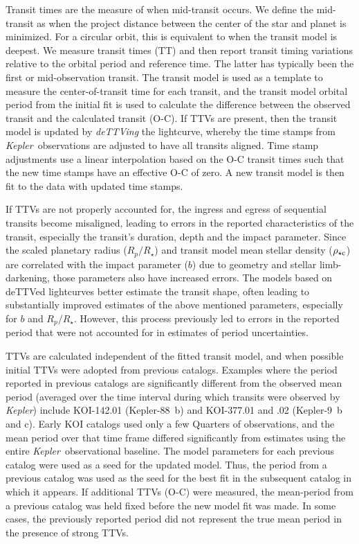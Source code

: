 \documentclass{aastex62}
\newcommand{\ikt}{{\it Kepler}}
\newcommand{\ik}{{\it Kepler~}}
\newcommand{\rhoc}{\ensuremath{\rho_{\star {\rm c}}}}
\begin{document}
{Transit times are the measure of when mid-transit occurs.  We define the mid-transit as when the project distance between the center of the star and planet is minimized.  For a circular orbit, this is equivalent to when the transit model is deepest. We measure transit times (TT) and then report transit timing variations relative to the orbital period and reference time.  The latter has typically been the first or mid-observation transit. The transit model is used as a template to measure the center-of-transit time for each transit, and the transit model orbital period from the initial fit is used to calculate the difference between the observed transit and the calculated transit (O-C).}   If TTVs are present, then the transit model is updated by {\it deTTVing} the lightcurve, whereby the time stamps from \ik observations are adjusted to have all transits aligned.  Time stamp adjustments use a linear interpolation based on the O-C transit times such that the new time stamps have an effective O-C of zero.  A new transit model is then fit to the data with updated time stamps. 

If TTVs are not properly accounted for, the ingress and egress of sequential transits become misaligned, leading to errors in the reported characteristics of the transit, especially the transit's duration, depth and the impact parameter.  Since the scaled planetary radius ($R_p/R_\star$) and transit model mean stellar density (\rhoc) are correlated with the impact parameter ($b$) due to geometry and stellar limb-darkening, those parameters also have increased errors.  The models based on deTTVed lightcurves better estimate the transit shape, {often leading to substantially improved estimates of the above mentioned parameters, especially} for $b$ and $R_p/R_\star$. However, this process {previously led to errors in the reported period that were not accounted for in estimates of period uncertainties.}

TTVs are calculated independent of the fitted transit model, and when possible initial TTVs were adopted from previous catalogs.  Examples where the period reported in previous catalogs are significantly different from the observed mean period (averaged over the time interval during which transits were observed by \ikt) include KOI-142.01 (Kepler-88~b) and KOI-377.01 and .02 (Kepler-9~b and c).  Early KOI catalogs used only a few Quarters of observations, and the mean period over that time frame differed significantly from estimates using the entire \ik observational baseline.  The model parameters for each previous catalog were used as a seed for the updated model.  Thus, the period from a previous catalog was used as the seed for the best fit in the subsequent catalog in which it appears.  If additional TTVs (O-C) were measured, the mean-period from a previous catalog was held fixed before the new model fit was made.  In some cases, the previously reported period did not represent the true mean period in the presence of strong TTVs. 
\end{document}
